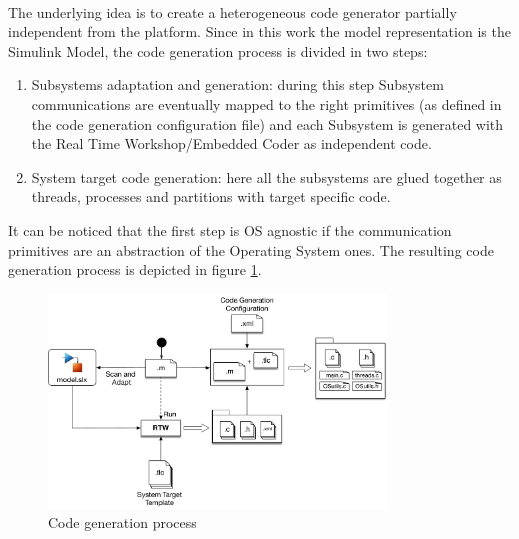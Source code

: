 \paragraph{} The underlying idea is to create a heterogeneous code generator partially independent from the platform. Since in this work the model representation is the Simulink Model, the code generation process is divided in two steps: \begin{enumerate}
\item Subsystems adaptation and generation: during this step Subsystem communications are eventually mapped to the right primitives (as defined in the code generation configuration file) and each Subsystem is generated with the Real Time Workshop/Embedded Coder as independent code.
\item System target code generation: here all the subsystems are glued together as threads, processes and partitions with target specific code.
\end{enumerate}
It can be noticed that the first step is OS agnostic if the communication primitives are an abstraction of the Operating System ones. The resulting code generation process is depicted in figure \ref{fig:CodeGenerationProcess}.
\begin{figure}[htbp] 
\centering    
\includegraphics[width=0.8\textwidth]{CodeGenerationProcess}
\caption{Code generation process}
\label{fig:CodeGenerationProcess}
\end{figure}



